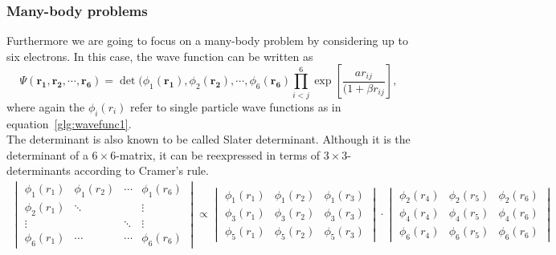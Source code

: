 \subsubsection{Many-body problems}
Furthermore we are going to focus on a many-body problem by considering up to six electrons. In this case, the wave function can be written as
\begin{equation}\label{glg:6electron}
\Psi(\mathbf{r_1,r_2,\cdots, r_6}) = \det(\phi_1(\mathbf{r_1}),\phi_2(\mathbf{r_2}),\cdots,\phi_6(\mathbf{r_6}) \prod_{i<j}^6 \exp\left[\frac{a r_{ij}}{(1+\beta r_{ij}}\right],
\end{equation}
where again the $\phi_i(r_i)$ refer to single particle wave functions as in equation~\ref{glg:wavefunc1}.\\
The determinant is also known to be called Slater determinant. Although it is the determinant of a $6\times 6$-matrix, it can be reexpressed in terms of $3\times 3$-determinants according to Cramer's rule.
\begin{align}
\begin{vmatrix}
\phi_1(r_1) & \phi_1(r_2) & \cdots & \phi_1(r_6)\\
\phi_2(r_1) & \ddots & &\vdots \\
\vdots & & \ddots& \vdots\\
\phi_6(r_1) & \cdots & \cdots & \phi_6(r_6)
\end{vmatrix}
\propto
\begin{vmatrix}
\phi_1(r_1)& \phi_1(r_2)& \phi_1(r_3)\\
\phi_3(r_1)& \phi_3(r_2)& \phi_3(r_3)\\
\phi_5(r_1)& \phi_5(r_2)& \phi_5(r_3)
\end{vmatrix}
\cdot
\begin{vmatrix}
\phi_2(r_4)& \phi_2(r_5)& \phi_2(r_6)\\
\phi_4(r_4)& \phi_4(r_5)& \phi_4(r_6)\\
\phi_6(r_4)& \phi_6(r_5)& \phi_6(r_6)
\end{vmatrix}
\end{align}
